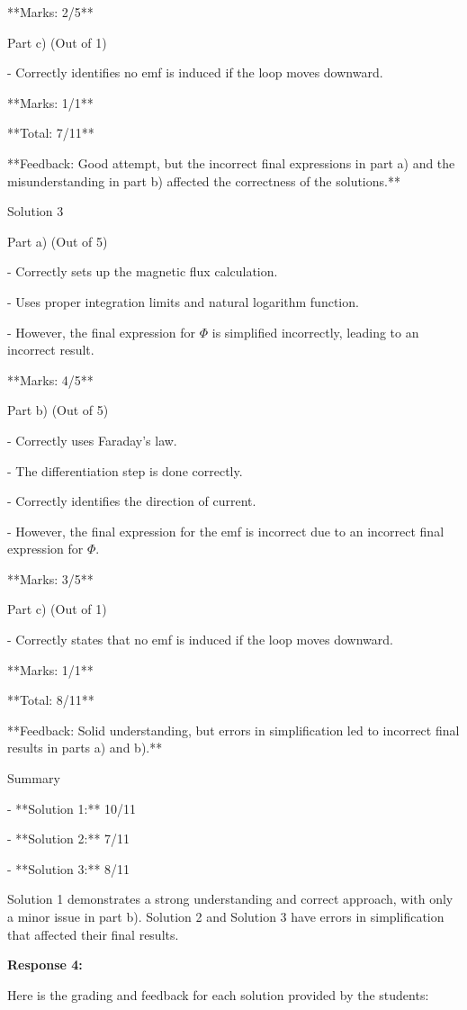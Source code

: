 \documentclass[a4paper,11pt]{article}
\begin{document}
**Marks: 2/5**

Part c) (Out of 1)

- Correctly identifies no emf is induced if the loop moves downward.

**Marks: 1/1**

**Total: 7/11**

**Feedback: Good attempt, but the incorrect final expressions in part a) and the misunderstanding in part b) affected the correctness of the solutions.**

Solution 3

Part a) (Out of 5)

- Correctly sets up the magnetic flux calculation.

- Uses proper integration limits and natural logarithm function.

- However, the final expression for \(\Phi\) is simplified incorrectly, leading to an incorrect result.

**Marks: 4/5**

Part b) (Out of 5)

- Correctly uses Faraday's law.

- The differentiation step is done correctly.

- Correctly identifies the direction of current.

- However, the final expression for the emf is incorrect due to an incorrect final expression for \(\Phi\).

**Marks: 3/5**

Part c) (Out of 1)

- Correctly states that no emf is induced if the loop moves downward.

**Marks: 1/1**

**Total: 8/11**

**Feedback: Solid understanding, but errors in simplification led to incorrect final results in parts a) and b).**

Summary

- **Solution 1:** 10/11

- **Solution 2:** 7/11

- **Solution 3:** 8/11

Solution 1 demonstrates a strong understanding and correct approach, with only a minor issue in part b). Solution 2 and Solution 3 have errors in simplification that affected their final results.

\bigskip 
\textbf{Response 4:}

Here is the grading and feedback for each solution provided by the students:
\end{document}
